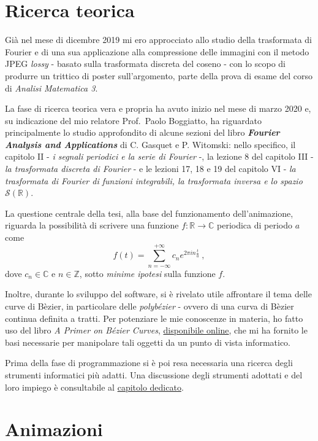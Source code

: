 \documentclass[
]{book}
\begin{document}
\hypertarget{ricerca}{%
\section{Ricerca teorica}\label{ricerca}}

Già nel mese di dicembre 2019 mi ero approcciato allo studio della trasformata di Fourier e di una sua applicazione alla compressione delle immagini con il metodo JPEG \emph{lossy} - basato sulla trasformata discreta del coseno - con lo scopo di produrre un trittico di poster sull'argomento, parte della prova di esame del corso di \emph{Analisi Matematica 3}.

La fase di ricerca teorica vera e propria ha avuto inizio nel mese di marzo 2020 e, su indicazione del mio relatore Prof.~Paolo Boggiatto, ha riguardato principalmente lo studio approfondito di alcune sezioni del libro \emph{\textbf{Fourier Analysis and Applications}} di C. Gasquet e P. Witomski: nello specifico, il capitolo II - \emph{i segnali periodici e la serie di Fourier} -, la lezione 8 del capitolo III - \emph{la trasformata discreta di Fourier} - e le lezioni 17, 18 e 19 del capitolo VI - \emph{la trasformata di Fourier di funzioni integrabili, la trasformata inversa e lo spazio \(\mathcal{S}(\mathbb{R})\)}.

La questione centrale della tesi, alla base del funzionamento dell'animazione, riguarda la possibilità di scrivere una funzione \(f: \mathbb{R} \longrightarrow \mathbb{C}\) periodica di periodo \(a\) come
\[f(t)=\sum_{n=-\infty}^{+\infty}c_{n}e^{2\pi in \frac{t}{a}} \ ,\]
dove \(c_n \in \mathbb{C}\) e \(n \in \mathbb{Z}\), sotto \emph{minime ipotesi} sulla funzione \(f\).

Inoltre, durante lo sviluppo del software, si è rivelato utile affrontare il tema delle curve di Bèzier, in particolare delle \emph{polybézier} - ovvero di una curva di Bèzier continua definita a tratti. Per potenziare le mie conoscenze in materia, ho fatto uso del libro \emph{A Primer on Bézier Curves}, \href{https://pomax.github.io/bezierinfo/}{disponibile online}, che mi ha fornito le basi necessarie per manipolare tali oggetti da un punto di vista informatico.

Prima della fase di programmazione si è poi resa necessaria una ricerca degli strumenti informatici più adatti. Una discussione degli strumenti adottati e del loro impiego è consultabile al \protect\hyperlink{software}{capitolo dedicato}.

\hypertarget{animazioni}{%
\section{Animazioni}\label{animazioni}}
\end{document}
